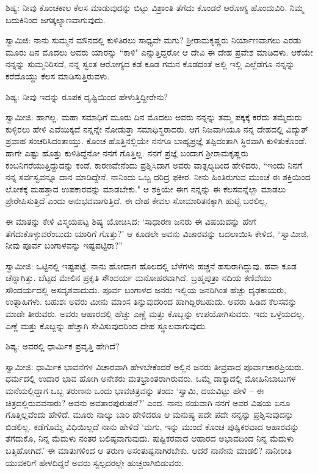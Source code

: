 ಶಿಷ್ಯ: ನೀವು ಕೊಂಚಕಾಲ ಕೆಲಸ ಮಾಡುವುದನ್ನು ಬಿಟ್ಟು ವಿಶ್ರಾಂತಿ ತೆಗೆದು ಕೊಂಡರೆ ಆರೋಗ್ಯ ಹೊಂದುವಿರಿ. ನಿಮ್ಮ ಬದುಕಿನಿಂದ ಜಗತ್ಕಲ್ಯಾಣವಾಗುವುದು.

ಸ್ವಾಮಿಜಿ: ನಾನು ಸುಮ್ಮನೆ ಮೌನದಲ್ಲಿ ಕುಳಿತಿರಲು ಸಾಧ್ಯವೇ ಮಗು? ಶ‍್ರೀರಾಮಕೃಷ್ಣರು ನಿರ್ಯಾಣವಾಗಲು ಎರಡು ಮೂರು ದಿನ ಮೊದಲು ಅವರು ಯಾರನ್ನು “ಕಾಳಿ" ಎನ್ನುತ್ತಿದ್ದರೋ ಆ ದೇವಿ ಈ ದೇಹ ಪ್ರವೇಶ ಮಾಡಿದಳು. ಆಕೆಯೇ ನನ್ನನ್ನು ಸುಮ್ಮನಿರಿಸದೆ, ನನ್ನ ಸ್ವಂತ ಆರೋಗ್ಯದ ಕಡೆ ಕೂಡ ಗಮನ ಕೊಡದಂತೆ ಅಲ್ಲಿ ಇಲ್ಲಿ ಎಲ್ಲೆಡೆಗೂ ನನ್ನನ್ನು ಕರೆದೊಯ್ದು ಕೆಲಸ ಮಾಡಿಸುತ್ತಿರುವಳು.

ಶಿಷ್ಯ: ನೀವು ಇದನ್ನು ರೂಪಕ ದೃಷ್ಟಿಯಿಂದ ಹೇಳುತ್ತಿದ್ದೀರೇನು?

ಸ್ವಾಮೀಜಿ: ಹಾಗಲ್ಲ. ಮಹಾ ಸಮಾಧಿಗೆ ಮೂರು ದಿನ ಮೊದಲು ಅವರು ನನ್ನನ್ನು ತಮ್ಮ ಪಕ್ಕಕ್ಕೆ ಕರೆದು ತಮ್ಮೆದುರು ಕುಳ್ಳಿರಲು ಹೇಳಿ ಎವೆಯಿಕ್ಕದೆ ನನ್ನನ್ನೇ ನೋಡುತ್ತಾ ಸಮಾಧಿಸ್ಥರಾದರು. ಆಗ ನಿಜವಾಗಿಯೂ ನನ್ನ ದೇಹದಲ್ಲಿ ವಿದ್ಯುತ್ ಪ್ರವಾಹ ಸಂಚರಿಸಿದಂತಾಯ್ತು. ಕೊಂಚ ಹೊತ್ತಿನಲ್ಲಿಯೇ ನನಗೂ ಬಾಹ್ಯಪ್ರಜ್ಞೆ ತಪ್ಪಿದಂತಾಗಿ ಸ್ಥಿರವಾಗಿ ಕುಳಿತುಕೊಂಡೆ. ಹಾಗೇ ಎಷ್ಟು ಹೊತ್ತು ಕುಳಿತಿದ್ದೆನೋ ನನಗೆ ಗೊತ್ತಿಲ್ಲ. ನನಗೆ ಪ್ರಜ್ಞೆ ಬಂದಾಗ ಶ‍್ರೀರಾಮಕೃಷ್ಣರು ಕಂಬನಿಗರೆಯುತ್ತಿದ್ದುದನ್ನು ಕಂಡೆ. ಕಾರಣವೇನೆಂದು ಪ್ರಶ್ನಿಸಿದಾಗ ಅವರು ವಾತ್ಸಲ್ಯದಿಂದ ಹೇಳಿದರು, “ಇಂದು ನಿನಗೆ ನನ್ನ ಸರ್ವಸ್ವವನ್ನೂ ದಾನ ಮಾಡಿದ್ದೇನೆ. ನಾನಿಂದು ಒಬ್ಬ ದರಿದ್ರ ಫಕೀರ. ನೀನು ಹಿಂತಿರುಗುವ ಮುಂಚೆ ಈ ಶಕ್ತಿಯಿಂದ ಲೋಕಕ್ಕೆ ಮಹತ್ತಾದ ಉಪಕಾರವನ್ನು ಮಾಡಬೇಕು." ಆ ಶಕ್ತಿಯೇ ಈಗ ನನ್ನನ್ನು ಈ ಕೆಲಸವನ್ನೆಲ್ಲಾ ಮಾಡಲು ಪ್ರೇರೇಪಿಸುತ್ತಿದೆ ಎಂದು ಅನುಭವವಾಗುತ್ತಿದೆ. ಈ ದೇಹ ಕೇವಲ ಸೋಮಾರಿತನಕ್ಕಾಗಿ ಹುಟ್ಟಿ ಬರಲಿಲ್ಲ.

ಈ ಮಾತನ್ನು ಕೇಳಿ ವಿಸ್ಮಯಪಟ್ಟ ಶಿಷ್ಯ ಯೋಚಿಸಿದ: ‘ಸಾಧಾರಣ ಜನರು ಈ ವಿಷಯವನ್ನು ಹೇಗೆ ತೆಗೆದುಕೊಳ್ಳುವರೆಂಬುದು ಯಾರಿಗೆ ಗೊತ್ತು?’ ಆ ಕೂಡಲೇ ಅವನು ವಿಚಾರವನ್ನು ಬದಲಾಯಿಸಿ ಕೇಳಿದ, “ಸ್ವಾಮೀಜಿ, ನೀವು ಪೂರ್ವ ಬಂಗಾಳವನ್ನು ಇಷ್ಟಪಟ್ಟಿರಾ?”

ಸ್ವಾಮೀಜಿ: ಒಟ್ಟಿನಲ್ಲಿ ಇಷ್ಟಪಟ್ಟೆ. ನಾನು ಹೋದಾಗ ಹೊಲದಲ್ಲಿ ಬೆಳೆಗಳು ಹಚ್ಚನೆ ಹಸುರಾಗಿದ್ದುವು. ಹವಾ ಕೂಡ ಚೆನ್ನಾಗಿತ್ತು. ಬೆಟ್ಟದ ಮೇಲಿನ ಪ್ರಕೃತಿ ಸೌಂದರ್ಯ ಮನೋಹರವಾಗಿದೆ. ಬ್ರಹ್ಮಪುತ್ರಾ ನದಿಯ ಕಣಿವೆಯು ಸೌಂದರ್ಯದಲ್ಲಿ ಅಸದೃಶವಾದುದು. ಪೂರ್ವ ಬಂಗಾಳದ ಜನರು ಇಲ್ಲಿಯ ಜನರಿಗಿಂತ ಹೆಚ್ಚು ದೃಢಕಾಯರು, ಉತ್ಸಾಹಿಗಳು. ಬಹುಶಃ ಅವರು ಮೀನು ಮಾಂಸ ತಿನ್ನುವುದರಿಂದ ಹಾಗಿದ್ದಿರಬಹುದು. ಅವರು ಹಿಡಿದ ಕೆಲಸವನ್ನು ಮಾಡೇ ತೀರುವರು. ಅವರು ಆಹಾರದಲ್ಲಿ ಹೆಚ್ಚು ಎಣ್ಣೆ ಮತ್ತು ಕೊಬ್ಬನ್ನು ಉಪಯೋಗಿಸುವರು. ಇದು ಒಳ್ಳೆಯದಲ್ಲ. ಎಣ್ಣೆ ಮತ್ತು ಕೊಬ್ಬನ್ನು ಹೆಚ್ಚಾಗಿ ಸೇವಿಸುವುದರಿಂದ ದೇಹ ಸ್ಥೂಲವಾಗುವುದು.

ಶಿಷ್ಯ: ಅವರಲ್ಲಿ ಧಾರ್ಮಿಕ ಪ್ರವೃತ್ತಿ ಹೇಗಿದೆ?

ಸ್ವಾಮೀಜಿ: ಧಾರ್ಮಿಕ ಭಾವನೆಗಳ ವಿಚಾರವಾಗಿ ಹೇಳಬೇಕೆಂದರೆ ಅಲ್ಲಿನ ಜನರು ತೀವ್ರವಾದ ಪೂರ್ವಾಚಾರಪ್ರಿಯರು. ಧರ್ಮದಲ್ಲಿ ಉದಾರ ಭಾವ ಹೋಗಿ ಅನೇಕರು ಮತಭ್ರಾಂತರಾಗಿರುವರು. ಒಮ್ಮೆ ಡಾಕ್ಕಾದಲ್ಲಿ ಮೋಹಿನಿಬಾಬುಗಳ ಮನೆಯಲ್ಲಿದ್ದಾಗ ಒಬ್ಬ ತರುಣನು ಒಂದು ಭಾವಚಿತ್ರವನ್ನು ತಂದು ‘ಸ್ವಾಮಿ, ದಯವಿಟ್ಟು ಹೇಳಿ – ಈ ಚಿತ್ರದಲ್ಲಿರುವವನಾರು? ಅವನು ಅವತಾರಪುರುಷನೆ?’ ಎಂದ. ನಾನು ನಯವಾಗಿ ನನಗೆ ಅವರ ವಿಷಯ ಏನೂ ಗೊತ್ತಿಲ್ಲವೆಂದು ಹೇಳಿದೆ. ಮೂರು ನಾಲ್ಕು ಬಾರಿ ಹೇಳಿದರೂ ಆ ಮನುಷ್ಯ ಪದೇ ಪದೇ ನನ್ನನ್ನು ಪ್ರಶ್ನಿಸುವುದನ್ನು ಬಿಡಲಿಲ್ಲ. ಕಡೆಗೊಮ್ಮೆ ವಿಧಿಯಿಲ್ಲದೆ ನಾನು ಹೇಳಿದೆ ‘ಮಗು, ಇನ್ನು ಮುಂದೆ ಕೊಂಚ ಪುಷ್ಟಿಕರವಾದ ಆಹಾರವನ್ನು ತೆಗೆದುಕೊ, ನಿನ್ನ ಮೆದುಳು ನಂತರ ಬಲಿಷ್ಠವಾಗುವುದು. ಪುಷ್ಟಿಕರವಾದ ಆಹಾರದ ಅಭಾವದಿಂದ ನಿನ್ನ ಮೆದುಳು ಬತ್ತಿಹೋಗಿದೆ.’ ಈ ಮಾತುಗಳಿಂದ ಆ ತರುಣ ಅಸಂತುಷ್ಟನಾಗಿರಬೇಕು. ಆದರೆ ನಾನೇನು ಮಾಡಲಿ? ನಾನೀರೀತಿ ಯುವಕರಿಗೆ ಹೇಳದಿದ್ದರೆ ಅವರು ಸ್ವಲ್ಪದರಲ್ಲೇ ಹುಚ್ಚರಾಗಿಬಿಡುವರು.

